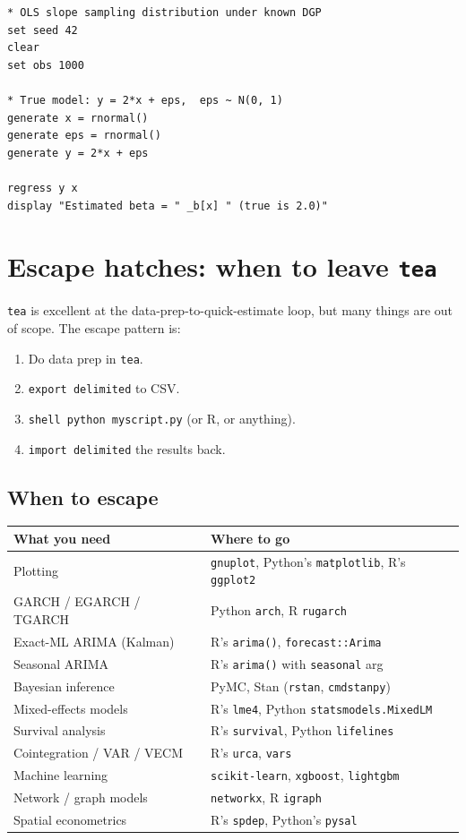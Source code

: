 \documentclass[11pt,letterpaper]{article}
\begin{document}
\begin{lstlisting}
* OLS slope sampling distribution under known DGP
set seed 42
clear
set obs 1000

* True model: y = 2*x + eps,  eps ~ N(0, 1)
generate x = rnormal()
generate eps = rnormal()
generate y = 2*x + eps

regress y x
display "Estimated beta = " _b[x] " (true is 2.0)"
\end{lstlisting}

\section{Escape hatches: when to leave \texttt{tea}}\label{sec:escape}

\texttt{tea} is excellent at the data-prep-to-quick-estimate loop, but
many things are out of scope.  The escape pattern is:

\begin{enumerate}
\item Do data prep in \texttt{tea}.
\item \texttt{export delimited} to CSV.
\item \texttt{shell python myscript.py} (or R, or anything).
\item \texttt{import delimited} the results back.
\end{enumerate}

\subsection{When to escape}

\begin{center}
\begin{tabular}{ll}
\toprule
What you need & Where to go \\
\midrule
Plotting & \texttt{gnuplot}, Python's \texttt{matplotlib}, R's \texttt{ggplot2} \\
GARCH / EGARCH / TGARCH & Python \texttt{arch}, R \texttt{rugarch} \\
Exact-ML ARIMA (Kalman) & R's \texttt{arima()}, \texttt{forecast::Arima} \\
Seasonal ARIMA & R's \texttt{arima()} with \texttt{seasonal} arg \\
Bayesian inference & PyMC, Stan (\texttt{rstan}, \texttt{cmdstanpy}) \\
Mixed-effects models & R's \texttt{lme4}, Python \texttt{statsmodels.MixedLM} \\
Survival analysis & R's \texttt{survival}, Python \texttt{lifelines} \\
Cointegration / VAR / VECM & R's \texttt{urca}, \texttt{vars} \\
Machine learning & \texttt{scikit-learn}, \texttt{xgboost}, \texttt{lightgbm} \\
Network / graph models & \texttt{networkx}, R \texttt{igraph} \\
Spatial econometrics & R's \texttt{spdep}, Python's \texttt{pysal} \\
\bottomrule
\end{tabular}
\end{center}
\end{document}
